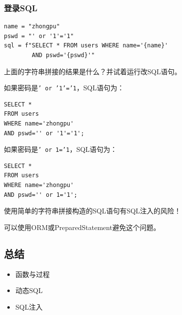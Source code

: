 \documentclass[aspectratio=169, 14pt]{beamer}
\begin{document}
\begin{frame}[fragile]
    \frametitle{登录SQL}

    \begin{verbatim}
name = "zhongpu"
pswd = "' or '1'='1"
sql = f"SELECT * FROM users WHERE name='{name}'
        AND pswd='{pswd}'"
    \end{verbatim}  

 上面的字符串拼接的结果是什么？并试着运行改SQL语句。
\end{frame}

\begin{frame}[fragile]

如果密码是\alert{\texttt{' or '1'='1}}，SQL语句为：

\begin{verbatim}
SELECT * 
FROM users 
WHERE name='zhongpu' 
AND pswd='' or '1'='1';
\end{verbatim}

\pause
如果密码是\alert{\texttt{' or 1='1}}，SQL语句为：

\begin{verbatim}
SELECT *
FROM users
WHERE name='zhongpu'
AND pswd='' or 1='1';
\end{verbatim}

\end{frame}

{
\begin{frame}[standout]
使用简单的字符串拼接构造的SQL语句有SQL注入的风险！

可以使用ORM或PreparedStatement避免这个问题。
\end{frame}
}


\begin{frame}[fragile]
    \section{\textcolor{darkmidnightblue}{总结}}

\begin{itemize}
    \item 函数与过程
    \item 动态SQL
    \item SQL注入
\end{itemize}
\end{frame}
\end{document}
